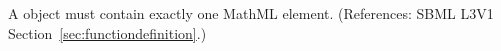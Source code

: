 A \FunctionDefinition object must contain exactly one MathML 
element.  (References: SBML L3V1 Section~\ref{sec:functiondefinition}.)
